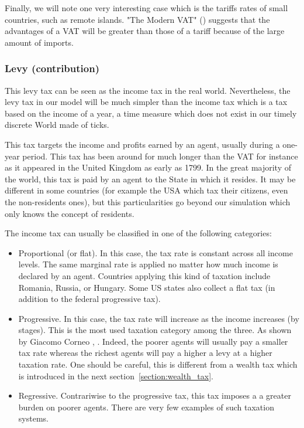     Finally, we will note one very interesting case which is the tariffs rates of small countries, such as remote islands. "The Modern VAT" (\cite{TheModernVAT}) suggests that the advantages of a VAT will be greater than those of a tariff because of the large amount of imports.
    
    
    \subsubsection{Levy (contribution)}
    
    This levy tax can be seen as the income tax in the real world. Nevertheless, the levy tax in our model will be much simpler than the income tax which is a tax based on the income of a year, a time measure which does not exist in our timely discrete World made of ticks.
    
    This tax targets the income and profits earned by an agent, usually during a one-year period. This tax has been around for much longer than the VAT for instance as it appeared in the United Kingdom as early as 1799. In the great majority of the world, this tax is paid by an agent to the State in which it resides. It may be different in some countries (for example the USA which tax their citizens, even the non-residents ones), but this particularities go beyond our simulation which only knows the concept of residents.
    
    The income tax can usually be classified in one of the following categories:
    
    \begin{itemize}
        \item Proportional (or flat). In this case, the tax rate is constant across all income levels. The same marginal rate is applied no matter how much income is declared by an agent. Countries applying this kind of taxation include Romania, Russia, or Hungary. Some US states also collect a flat tax (in addition to the federal progressive tax).
        
        \item Progressive. In this case, the tax rate will increase as the income increases (by stages). This is the most used taxation category among the three. As shown by Giacomo Corneo \cite{progressive_taxation}, . Indeed, the poorer agents will usually pay a smaller tax rate whereas the richest agents will pay a higher a levy at a higher taxation rate. One should be careful, this is different from a wealth tax which is introduced in the next section~\ref{section:wealth_tax}.
        
        \item Regressive. Contrariwise to the progressive tax, this tax imposes a a greater burden on poorer agents. There are very few examples of such taxation systems.
    \end{itemize}
    
